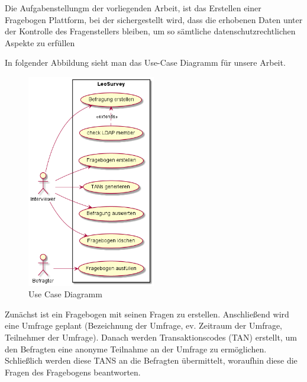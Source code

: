 \author{Weissengruber Nina}
Die Aufgabenstellungm der vorliegenden Arbeit, ist das Erstellen einer Fragebogen Plattform, 
bei der sichergestellt wird, dass die erhobenen Daten unter der Kontrolle des Fragenstellers bleiben, um so sämtliche datenschutzrechtlichen Aspekte zu erfüllen

In folgender Abbildung sieht man das Use-Case Diagramm für unsere Arbeit.

\begin{figure}[!htb]
    \includegraphics[width=0.5\textwidth]{pics/ucd.png}
    \centering
    \caption{Use Case Diagramm}
\end{figure}

Zunächst ist ein Fragebogen mit seinen Fragen zu erstellen. 
Anschließend wird eine Umfrage geplant (Bezeichnung der Umfrage, ev. Zeitraum der Umfrage, 
Teilnehmer der Umfrage). Danach werden Transaktionscodes (TAN) erstellt, 
um den Befragten eine anonyme Teilnahme an der Umfrage zu ermöglichen. Schließlich werden diese 
TANS an die Befragten übermittelt, woraufhin diese die Fragen des Fragebogens beantworten.
